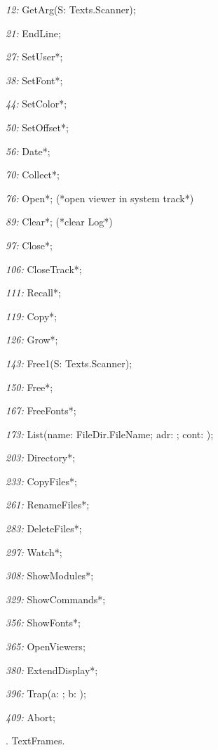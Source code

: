 \item{\it 12:} GetArg(\VAR S: Texts.Scanner);
\item{\it 21:} EndLine;
\item{\it 27:} SetUser*;
\item{\it 38:} SetFont*;
\item{\it 44:} SetColor*;
\item{\it 50:} SetOffset*;
\item{\it 56:} Date*;
\item{\it 70:} Collect*;
\item{\it 76:} Open*;  (*open viewer in system track*)
\item{\it 89:} Clear*;  (*clear Log*)
\item{\it 97:} Close*;
\item{\it 106:} CloseTrack*;
\item{\it 111:} Recall*;
\item{\it 119:} Copy*;
\item{\it 126:} Grow*;
\item{\it 143:} Free1(\VAR S: Texts.Scanner);
\item{\it 150:} Free*;
\item{\it 167:} FreeFonts*;
\item{\it 173:} List(name: FileDir.FileName; adr: \LONGINT; \VAR cont: \BOOLEAN);
\item{\it 203:} Directory*;
\item{\it 233:} CopyFiles*;
\item{\it 261:} RenameFiles*;
\item{\it 283:} DeleteFiles*;
\item{\it 297:} Watch*;
\item{\it 308:} ShowModules*;
\item{\it 329:} ShowCommands*;
\item{\it 356:} ShowFonts*;
\item{\it 365:} OpenViewers;
\item{\it 380:} ExtendDisplay*;
\item{\it 396:} Trap(\VAR a: \INTEGER; b: \INTEGER);
\item{\it 409:} Abort;

. TextFrames.

